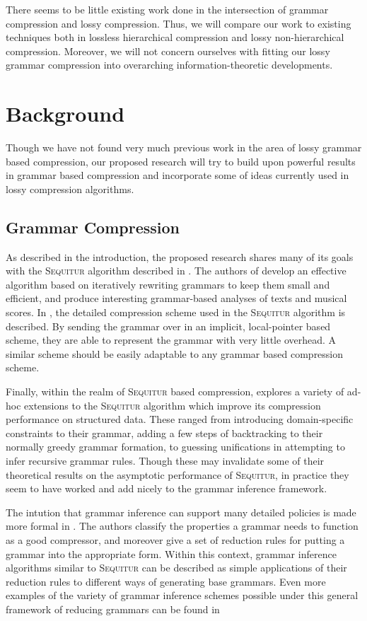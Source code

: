 \documentclass[11pt]{article}
\newcommand{\Sequitur}{\textsc{Sequitur}\xspace}
\begin{document}
There seems to be little existing work done in the intersection of grammar
compression and lossy compression.  Thus, we will compare our work to existing
techniques both in lossless hierarchical compression and lossy non-hierarchical
compression.  Moreover, we will not concern ourselves with fitting our lossy
grammar compression into overarching information-theoretic developments.

\section{Background}

Though we have not found very much previous work in the area of lossy grammar
based compression, our proposed research will try to build upon powerful
results in grammar based compression and incorporate some of ideas currently
used in lossy compression algorithms.

\subsection{Grammar Compression}

As described in the introduction, the proposed research shares many of its
goals with the \Sequitur algorithm described in \cite{sequitur}.  The authors
of \cite{sequitur} develop an effective algorithm based on iteratively
rewriting grammars to keep them small and efficient, and produce interesting
grammar-based analyses of texts and musical scores.  In \cite{sequitur2}, the
detailed compression scheme used in the \Sequitur algorithm is described.  By
sending the grammar over in an implicit, local-pointer based scheme, they are
able to represent the grammar with very little overhead.  A similar scheme
should be easily adaptable to any grammar based compression scheme.

Finally, within the realm of \Sequitur based compression, \cite{nevillphd}
explores a variety of ad-hoc extensions to the \Sequitur algorithm which
improve its compression performance on structured data.  These ranged from
introducing domain-specific constraints to their grammar, adding a few steps of
backtracking to their normally greedy grammar formation, to guessing
unifications in attempting to infer recursive grammar rules.  Though these may
invalidate some of their theoretical results on the asymptotic performance of
\Sequitur, in practice they seem to have worked and add nicely to the grammar
inference framework.

The intution that grammar inference can support many detailed policies is made
more formal in \cite{grammarcodes}.  The authors classify the properties a
grammar needs to function as a good compressor, and moreover give a set of
reduction rules for putting a grammar into the appropriate form.  Within this
context, grammar inference algorithms similar to \Sequitur can be described as
simple applications of their reduction rules to different ways of generating
base grammars.  Even more examples of the variety of grammar inference schemes
possible under this general framework of reducing grammars can be found in
\cite{efficientgreedy}
\end{document}
